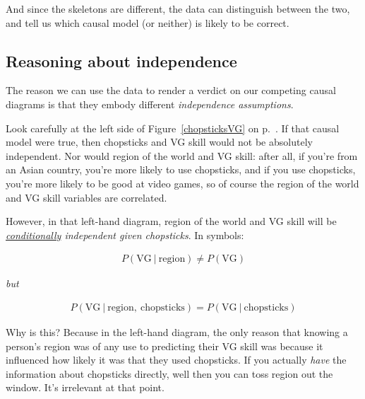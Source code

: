 And since the skeletons are different, the data can distinguish between the
two, and tell us which causal model (or neither) is likely to be correct.

\subsection{Reasoning about independence}


The reason we can use the data to render a verdict on our competing causal
diagrams is that they embody different \textit{independence assumptions}.

Look carefully at the left side of Figure~\ref{chopsticksVG} on
p.~\pageref{chopsticksVG}. If that causal model were true, then
\textsf{chopsticks} and \textsf{VG skill} would not be absolutely independent.
Nor would \textsf{region of the world} and \textsf{VG skill}: after all, if
you're from an Asian country, you're more likely to use chopsticks, and if you
use chopsticks, you're more likely to be good at video games, so of course
the \textsf{region of the world} and \textsf{VG skill} variables are
correlated.


However, in that left-hand diagram, \textsf{region of the world} and \textsf{VG
skill} will be \textit{\underline{conditionally} independent given
\textsf{chopsticks}}. In symbols:

\vspace{-.1in}
\begin{samepage}
\begin{align*}
P(\textrm{VG}\ |\ \textrm{region}) \neq P(\textrm{VG})
\end{align*}
\begin{center}
\vspace{-.1in}
\textit{but}
\vspace{-.1in}
\end{center}
\vspace{-.1in}
\begin{align*}
P(\textrm{VG}\ |\ \textrm{region},\ \textrm{chopsticks}) =
P(\textrm{VG}\ |\ \textrm{chopsticks})
\end{align*}
\end{samepage}

Why is this? Because in the left-hand diagram, the only reason that knowing
a person's \textsf{region} was of any use to predicting their \textsf{VG skill}
was because it influenced how likely it was that they used \textsf{chopsticks}.
If you actually \textit{have} the information about \textsf{chopsticks}
directly, well then you can toss \textsf{region} out the window. It's
irrelevant at that point.

